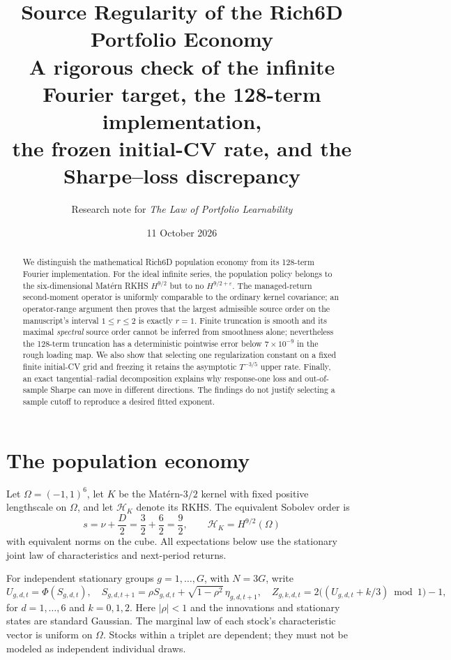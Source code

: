 \documentclass[11pt,a4paper]{article}
\title{Source Regularity of the Rich6D Portfolio Economy\\
\large A rigorous check of the infinite Fourier target, the 128-term implementation,\\ the frozen initial-CV rate, and the Sharpe--loss discrepancy}
\author{Research note for \emph{The Law of Portfolio Learnability}}
\date{11 October 2026}
\theoremstyle{remark}
\newcommand{\Hh}{\mathcal H_K}
\begin{document}
\maketitle
\begin{abstract}
We distinguish the mathematical Rich6D population economy from its 128-term Fourier implementation. For the ideal infinite series, the population policy belongs to the six-dimensional Mat\'ern RKHS $H^{9/2}$ but to no $H^{9/2+\varepsilon}$. The managed-return second-moment operator is uniformly comparable to the ordinary kernel covariance; an operator-range argument then proves that the largest admissible source order on the manuscript's interval $1\le r\le2$ is exactly $r=1$. Finite truncation is smooth and its maximal \emph{spectral} source order cannot be inferred from smoothness alone; nevertheless the 128-term truncation has a deterministic pointwise error below $7\times10^{-9}$ in the rough loading map. We also show that selecting one regularization constant on a fixed finite initial-CV grid and freezing it retains the asymptotic $T^{-3/5}$ upper rate. Finally, an exact tangential--radial decomposition explains why response-one loss and out-of-sample Sharpe can move in different directions. The findings do not justify selecting a sample cutoff to reproduce a desired fitted exponent.
\end{abstract}

\section{The population economy}
Let $\Omega=(-1,1)^6$, let $K$ be the Mat\'ern-$3/2$ kernel with fixed positive lengthscale on $\Omega$, and let $\Hh$ denote its RKHS. The equivalent Sobolev order is
\begin{equation}\label{eq:s}
 s=\nu+\frac{D}{2}=\frac32+\frac62=\frac92,
 \qquad \Hh=H^{9/2}(\Omega)
\end{equation}
with equivalent norms on the cube. All expectations below use the stationary joint law of characteristics and next-period returns.

For independent stationary groups $g=1,\ldots,G$, with $N=3G$, write
\begin{equation}
 U_{g,d,t}=\Phi(S_{g,d,t}),\quad
 S_{g,d,t+1}=\rho S_{g,d,t}+\sqrt{1-\rho^2}\,\eta_{g,d,t+1},\quad
 Z_{g,k,d,t}=2\bigl((U_{g,d,t}+k/3)\bmod1\bigr)-1,
\end{equation}
for $d=1,\ldots,6$ and $k=0,1,2$. Here $|\rho|<1$ and the innovations and stationary states are standard Gaussian. The marginal law of each stock's characteristic vector is uniform on $\Omega$. Stocks within a triplet are dependent; they must not be modeled as independent individual draws.
\end{document}

